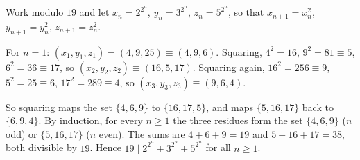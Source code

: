 Work modulo $19$ and let $x_n=2^{2^n}$, $y_n=3^{2^n}$, $z_n=5^{2^n}$, so that $x_{n+1}=x_n^2$, $y_{n+1}=y_n^2$, $z_{n+1}=z_n^2$.

For $n=1$: $(x_1,y_1,z_1)=(4,9,25)\equiv(4,9,6)$. Squaring, $4^2=16$, $9^2=81\equiv5$, $6^2=36\equiv17$, so $(x_2,y_2,z_2)\equiv(16,5,17)$. Squaring again, $16^2=256\equiv9$, $5^2=25\equiv6$, $17^2=289\equiv4$, so $(x_3,y_3,z_3)\equiv(9,6,4)$.

So squaring maps the set $\{4,6,9\}$ to $\{16,17,5\}$, and maps $\{5,16,17\}$ back to $\{6,9,4\}$. By induction, for every $n\ge1$ the three residues form the set $\{4,6,9\}$ ($n$ odd) or $\{5,16,17\}$ ($n$ even). The sums are $4+6+9=19$ and $5+16+17=38$, both divisible by $19$. Hence $\boxed{19\mid2^{2^n}+3^{2^n}+5^{2^n}}$ for all $n\ge1$.
